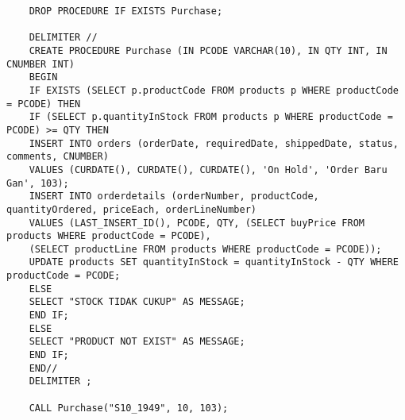 \documentclass{article}
\begin{document}
	\begin{verbatim}
	DROP PROCEDURE IF EXISTS Purchase;
	
	DELIMITER // 
	CREATE PROCEDURE Purchase (IN PCODE VARCHAR(10), IN QTY INT, IN CNUMBER INT) 
	BEGIN
	IF EXISTS (SELECT p.productCode FROM products p WHERE productCode = PCODE) THEN
	IF (SELECT p.quantityInStock FROM products p WHERE productCode = PCODE) >= QTY THEN
	INSERT INTO orders (orderDate, requiredDate, shippedDate, status, comments, CNUMBER)
	VALUES (CURDATE(), CURDATE(), CURDATE(), 'On Hold', 'Order Baru Gan', 103);
	INSERT INTO orderdetails (orderNumber, productCode, quantityOrdered, priceEach, orderLineNumber)
	VALUES (LAST_INSERT_ID(), PCODE, QTY, (SELECT buyPrice FROM products WHERE productCode = PCODE),
	(SELECT productLine FROM products WHERE productCode = PCODE));
	UPDATE products SET quantityInStock = quantityInStock - QTY WHERE productCode = PCODE;
	ELSE
	SELECT "STOCK TIDAK CUKUP" AS MESSAGE;
	END IF;
	ELSE
	SELECT "PRODUCT NOT EXIST" AS MESSAGE;
	END IF;
	END//
	DELIMITER ;
	
	CALL Purchase("S10_1949", 10, 103);
	\end{verbatim}
\end{document}
